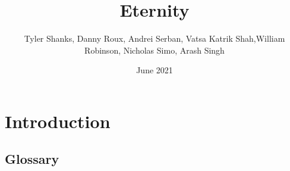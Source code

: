 \documentclass[titlepage]{article}
\begin{document}
\title{Eternity}
\author{Tyler Shanks, Danny Roux, Andrei Serban, Vatsa Katrik Shah,\newpage William Robinson, Nicholas Simo, Arash Singh}
\date{June 2021}
\maketitle

\fancyfoot{\thepage}

\tableofcontents
\newpage

\section{Introduction}
    \subsection{Glossary}
        \blindtext[5]
        
\end{document}
